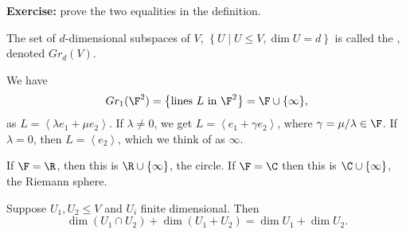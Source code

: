 \textbf{Exercise:} prove the two equalities in the definition.

\begin{definition}
	The set of $d$-dimensional subspaces of $V$, $\left\{U\mid U\leq V, \dim U=d\right\}$ is called the , denoted $Gr_d(V)$. %
\end{definition}

\begin{example}
	We have
	\begin{equation*}
		Gr_1(\F^2) = \left\{\text{lines } L \text{ in } \F^2\right\} = \F\cup\{\infty\},
	\end{equation*}
	as $L=\left\langle \lambda e_1 + \mu e_2 \right\rangle$. If $\lambda\neq 0$, we get $L=\left\langle e_1+\gamma e_2 \right\rangle$, where $\gamma=\mu/\lambda \in \F$. If $\lambda = 0$, then $L = \left\langle e_2 \right\rangle$, which we think of as $\infty$. %
	
	If $\F=\R$, then this is $\R\cup\{\infty\}$, the circle. If $\F=\C$ then this is $\C\cup\{\infty\}$, the Riemann sphere. %
\end{example}

\begin{theorem}
	Suppose $U_1,U_2\leq V$ and $U_i$ finite dimensional. Then %
	\begin{equation*}
		\dim(U_1 \cap U_2) + \dim(U_1+U_2) = \dim U_1 + \dim U_2.
	\end{equation*}
\end{theorem}

